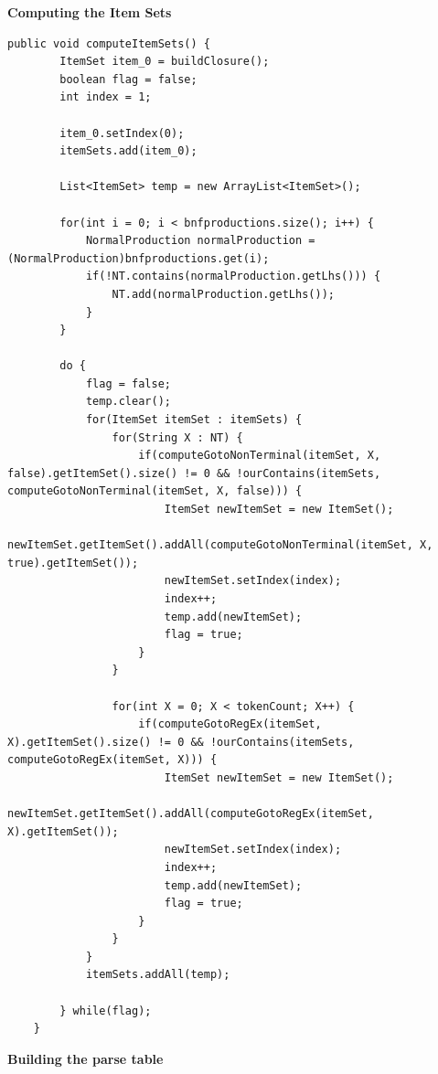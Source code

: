 \documentclass[•]{book}
\begin{document}
\textbf{Computing the Item Sets}
\begin{lstlisting}
public void computeItemSets() {
		ItemSet item_0 = buildClosure();
		boolean flag = false;
		int index = 1;
		
		item_0.setIndex(0);
		itemSets.add(item_0);
		
		List<ItemSet> temp = new ArrayList<ItemSet>();
		
		for(int i = 0; i < bnfproductions.size(); i++) {
			NormalProduction normalProduction = (NormalProduction)bnfproductions.get(i);
			if(!NT.contains(normalProduction.getLhs())) {
				NT.add(normalProduction.getLhs());
			}
		}
		
		do {
			flag = false;
			temp.clear();
			for(ItemSet itemSet : itemSets) {
				for(String X : NT) {
					if(computeGotoNonTerminal(itemSet, X, false).getItemSet().size() != 0 && !ourContains(itemSets, computeGotoNonTerminal(itemSet, X, false))) {
						ItemSet newItemSet = new ItemSet();
						newItemSet.getItemSet().addAll(computeGotoNonTerminal(itemSet, X, true).getItemSet());
						newItemSet.setIndex(index);
						index++;
						temp.add(newItemSet);
						flag = true;
					}
				}
				
				for(int X = 0; X < tokenCount; X++) {
					if(computeGotoRegEx(itemSet, X).getItemSet().size() != 0 && !ourContains(itemSets, computeGotoRegEx(itemSet, X))) {
						ItemSet newItemSet = new ItemSet();
						newItemSet.getItemSet().addAll(computeGotoRegEx(itemSet, X).getItemSet());
						newItemSet.setIndex(index);
						index++;
						temp.add(newItemSet);
						flag = true;
					}
				}
			}
			itemSets.addAll(temp);
			
		} while(flag);
	}
\end{lstlisting}
\textbf{Building the parse table}
\end{document}
